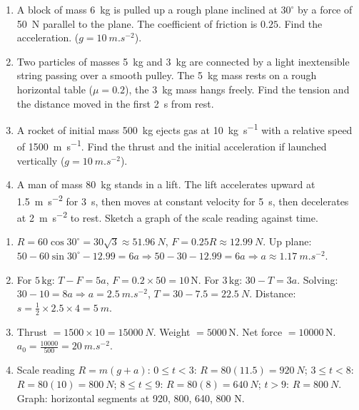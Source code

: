 \documentclass[11pt]{article}
\begin{document}
\begin{exercice}
\begin{enumerate}
    \item A block of mass \SI{6}{kg} is pulled up a rough plane inclined at $30^\circ$ by a force of \SI{50}{N} parallel to the plane. The coefficient of friction is $0.25$. Find the acceleration. ($g=\SI{10}{m.s^{-2}}$).
    \item Two particles of masses \SI{5}{kg} and \SI{3}{kg} are connected by a light inextensible string passing over a smooth pulley. The \SI{5}{kg} mass rests on a rough horizontal table ($\mu=0.2$), the \SI{3}{kg} mass hangs freely. Find the tension and the distance moved in the first \SI{2}{s} from rest.
    \item A rocket of initial mass \SI{500}{kg} ejects gas at \SI{10}{kg.s^{-1}} with a relative speed of \SI{1500}{m.s^{-1}}. Find the thrust and the initial acceleration if launched vertically ($g=\SI{10}{m.s^{-2}}$).
    \item A man of mass \SI{80}{kg} stands in a lift. The lift accelerates upward at \SI{1.5}{m.s^{-2}} for \SI{3}{s}, then moves at constant velocity for \SI{5}{s}, then decelerates at \SI{2}{m.s^{-2}} to rest. Sketch a graph of the scale reading against time.
\end{enumerate}
\end{exercice}

\begin{corrige}[Exercise 3]
\begin{enumerate}
    \item $R = 60\cos30^\circ = 30\sqrt{3}\approx\SI{51.96}{N}$, $F = 0.25R \approx \SI{12.99}{N}$. Up plane: $50 - 60\sin30^\circ - 12.99 = 6a \Rightarrow 50 - 30 - 12.99 = 6a \Rightarrow a \approx \SI{1.17}{m.s^{-2}}$.
    \item For $5\,\mathrm{kg}$: $T - F = 5a$, $F = 0.2\times50 = 10\,\mathrm{N}$. For $3\,\mathrm{kg}$: $30 - T = 3a$. Solving: $30 - 10 = 8a \Rightarrow a = \SI{2.5}{m.s^{-2}}$, $T = 30 - 7.5 = \SI{22.5}{N}$. Distance: $s = \frac{1}{2}\times2.5\times4 = \SI{5}{m}$.
    \item Thrust $= 1500 \times 10 = \SI{15000}{N}$. Weight $= 5000\,\mathrm{N}$. Net force $= 10000\,\mathrm{N}$. $a_0 = \frac{10000}{500} = \SI{20}{m.s^{-2}}$.
    \item Scale reading $R = m(g+a)$: $0\le t<3$: $R=80(11.5)=\SI{920}{N}$; $3\le t<8$: $R=80(10)=\SI{800}{N}$; $8\le t\le 9$: $R=80(8)=\SI{640}{N}$; $t>9$: $R=\SI{800}{N}$. Graph: horizontal segments at 920, 800, 640, 800 N.
\end{enumerate}
\end{corrige}
\end{document}
